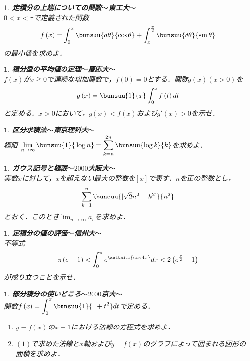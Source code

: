 \documentclass[10pt,
fleqn,
dvipdfmx,
uplatex
]{jsarticle}
\newtheorem{question}[Question]{}
\begin{document}
\begin{question}{\bf\boldmath 定積分の上端についての関数$〜$東工大$〜$}\\
$0<x<\pi$で定義された関数
\[f\left(x\right)=\displaystyle\int_0^x\bunsuu{{d\theta }}{{\cos \theta }}+\displaystyle\int_x^{\frac{\pi }{2}}\bunsuu{{d\theta }}{{\sin \theta }}\]
の最小値を求めよ．
\end{question}



\begin{question}{\bf\boldmath 積分型の平均値の定理$〜$慶応大$〜$}\\
$f\left(x\right)$が$x\geqq 0$で連続な増加関数で，$f\left(0\right)=0$とする．関数$g\left(x\right)\left(x>0\right)$を
\[g\left(x\right)=\bunsuu{1}{x}\displaystyle\int_0^xf\left(t\right)dt\]
と定める．$x>0$において，$g\left(x\right)<f\left(x\right)$および$g'\left(x\right)>0$を示せ．
\end{question}



\begin{question}{\bf\boldmath 区分求積法$〜$東京理科大$〜$}\\
極限
$\displaystyle\lim_{n\to \infty }\bunsuu{1}{{}\log n}=\displaystyle\sum_{k=n}^{2n}\bunsuu{{\log k}}{k}$を求めよ．
\end{question}



\begin{question}{\bf\boldmath ガウス記号と極限$〜2000$大阪大$〜$}\\
実数$x$に対して，$x$を超えない最大の整数を$[x]$で表す．$n$を正の整数とし，
\[\displaystyle\sum_{k=1}^n\bunsuu{{[\sqrt 2n^2-k^2]}}{{n^2}}\]
とおく．このとき$\displaystyle\lim_{n\to \infty }a_n$を求めよ．
\end{question}



\begin{question}{\bf\boldmath 定積分の値の評価$〜$信州大$〜$}\\
不等式
\[\pi \left(e-1\right)<\displaystyle\int_0^\pi e^{\zettaiti{\cos 4x}}dx<2\left(e^{\frac{\pi }{2}}-1\right)\]
が成り立つことを示せ．
\end{question}



\begin{question}{\bf\boldmath 部分積分の使いどころ$〜2000$京大$〜$}\\
関数$f\left(x\right)=\displaystyle\int_0^x\bunsuu{1}{{}1+t^2}dt$で定める．
\begin{enumerate}
\item $y=f\left(x\right)$の$x=1$における法線の方程式を求めよ．
\item $\left(1\right)$で求めた法線と$x$軸および$y=f\left(x\right)$のグラフによって囲まれる図形の面積を求めよ．
\end{enumerate}

\end{question}
\end{document}
